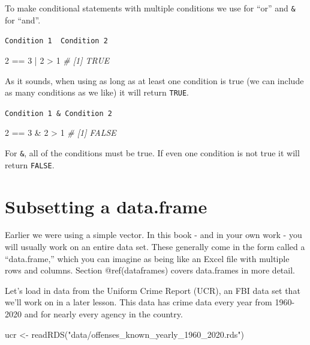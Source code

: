 \documentclass[
  a4paper,
]{krantz}
\makeatletter
\newenvironment{Shaded}{\begin{snugshade}}{\end{snugshade}}
\newcommand{\CommentTok}[1]{\textcolor[rgb]{0.56,0.35,0.01}{\textit{#1}}}
\newcommand{\DecValTok}[1]{\textcolor[rgb]{0.00,0.00,0.81}{#1}}
\newcommand{\FunctionTok}[1]{\textcolor[rgb]{0.00,0.00,0.00}{#1}}
\newcommand{\NormalTok}[1]{#1}
\newcommand{\OtherTok}[1]{\textcolor[rgb]{0.56,0.35,0.01}{#1}}
\newcommand{\SpecialCharTok}[1]{\textcolor[rgb]{0.00,0.00,0.00}{#1}}
\newcommand{\StringTok}[1]{\textcolor[rgb]{0.31,0.60,0.02}{#1}}
\newenvironment{kframe}{%
\medskip{}
\setlength{\fboxsep}{.8em}
 \def\at@end@of@kframe{}%
 \ifinner\ifhmode%
  \def\at@end@of@kframe{\end{minipage}}%
  \begin{minipage}{\columnwidth}%
 \fi\fi%
 \def\FrameCommand##1{\hskip\@totalleftmargin \hskip-\fboxsep
 \colorbox{shadecolor}{##1}\hskip-\fboxsep
     \hskip-\linewidth \hskip-\@totalleftmargin \hskip\columnwidth}%
 \MakeFramed {\advance\hsize-\width
   \@totalleftmargin\z@ \linewidth\hsize
   \@setminipage}}%
 {\par\unskip\endMakeFramed%
 \at@end@of@kframe}
\renewenvironment{Shaded}{\begin{kframe}}{\end{kframe}}
\makeatother
\begin{document}
To make conditional statements with multiple conditions we
use \texttt{\textbar{}} for ``or'' and \texttt{\&} for
``and''.

\texttt{Condition\ 1\ \textbar{}\ Condition\ 2}

\begin{Shaded}
\begin{Highlighting}[]
\DecValTok{2} \SpecialCharTok{==} \DecValTok{3} \SpecialCharTok{|} \DecValTok{2} \SpecialCharTok{\textgreater{}} \DecValTok{1}
\CommentTok{\# [1] TRUE}
\end{Highlighting}
\end{Shaded}

As it sounds, when using \texttt{\textbar{}} as long as at
least one condition is true (we can include as many
conditions as we like) it will return \texttt{TRUE}.

\texttt{Condition\ 1\ \&\ Condition\ 2}

\begin{Shaded}
\begin{Highlighting}[]
\DecValTok{2} \SpecialCharTok{==} \DecValTok{3} \SpecialCharTok{\&} \DecValTok{2} \SpecialCharTok{\textgreater{}} \DecValTok{1}
\CommentTok{\# [1] FALSE}
\end{Highlighting}
\end{Shaded}

For \texttt{\&}, all of the conditions must be true. If even
one condition is not true it will return \texttt{FALSE}.

\hypertarget{subsetting-a-data.frame}{%
\section{Subsetting a
data.frame}\label{subsetting-a-data.frame}}

Earlier we were using a simple vector. In this book - and in
your own work - you will usually work on an entire data set.
These generally come in the form called a ``data.frame,''
which you can imagine as being like an Excel file with
multiple rows and columns. Section @ref(dataframes) covers
data.frames in more detail.

Let's load in data from the Uniform Crime Report (UCR), an
FBI data set that we'll work on in a later lesson. This data
has crime data every year from 1960-2020 and for nearly
every agency in the country.

\begin{Shaded}
\begin{Highlighting}[]
\NormalTok{ucr }\OtherTok{\textless{}{-}} \FunctionTok{readRDS}\NormalTok{(}\StringTok{"data/offenses\_known\_yearly\_1960\_2020.rds"}\NormalTok{)}
\end{Highlighting}
\end{Shaded}
\end{document}
